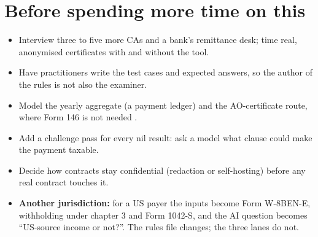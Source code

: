 \documentclass[10pt,a4paper]{article}
\begin{document}
\section{Before spending more time on this}
\begin{itemize}
  \item Interview three to five more CAs and a bank's remittance desk; time real, anonymised certificates with and without the tool.
  \item Have practitioners write the test cases and expected answers, so the author of the rules is not also the examiner.
  \item Model the yearly aggregate (a payment ledger) and the AO-certificate route, where Form 146 is not needed \cite{faqforms}.
  \item Add a challenge pass for every nil result: ask a model what clause could make the payment taxable.
  \item Decide how contracts stay confidential (redaction or self-hosting) before any real contract touches it.
  \item \textbf{Another jurisdiction:} for a US payer the inputs become Form W-8BEN-E, withholding under chapter 3 and Form 1042-S, and the AI question becomes ``US-source income or not?''. The rules file changes; the three lanes do not.
\end{itemize}
\end{document}
